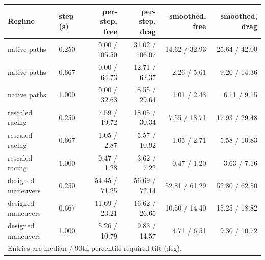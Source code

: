 \footnotesize
\begin{tabular}{llrrrr}
\toprule
Regime & step (s) & per-step, free & per-step, drag & smoothed, free & smoothed, drag \\
\midrule
native paths & 0.250 & 0.00 / 105.50 & 31.02 / 106.07 & 14.62 / 32.93 & 25.64 / 42.00 \\
native paths & 0.667 & 0.00 / 64.73 & 12.71 / 62.37 & 2.26 / 5.61 & 9.20 / 14.36 \\
native paths & 1.000 & 0.00 / 32.63 & 8.55 / 29.64 & 1.01 / 2.48 & 6.11 / 9.15 \\
rescaled racing & 0.250 & 7.59 / 19.72 & 18.05 / 30.34 & 7.55 / 18.71 & 17.93 / 29.48 \\
rescaled racing & 0.667 & 1.05 / 2.87 & 5.57 / 10.92 & 1.05 / 2.71 & 5.58 / 10.83 \\
rescaled racing & 1.000 & 0.47 / 1.28 & 3.62 / 7.22 & 0.47 / 1.20 & 3.63 / 7.16 \\
designed maneuvers & 0.250 & 54.45 / 71.25 & 56.69 / 72.14 & 52.81 / 61.29 & 52.80 / 62.50 \\
designed maneuvers & 0.667 & 11.69 / 23.21 & 16.62 / 26.65 & 10.50 / 14.40 & 15.25 / 18.82 \\
designed maneuvers & 1.000 & 5.26 / 10.79 & 9.83 / 14.57 & 4.71 / 6.51 & 9.30 / 10.72 \\
\bottomrule
\multicolumn{6}{l}{\footnotesize Entries are median / 90th percentile required tilt (deg).} \\
\end{tabular}

